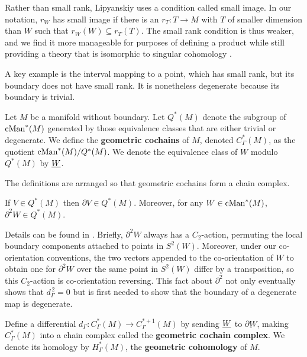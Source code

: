 Rather than small rank, Lipyanskiy uses a condition called small image.
In our notation, $r_W$ has small image if there is an $r_T \colon T \to M$ with $T$ of smaller dimension than $W$ such that $r_W(W) \subseteq r_T(T)$.
The small rank condition is thus weaker, and we find it more manageable for purposes of defining a product while still providing a theory that is isomorphic to singular cohomology \cite{medina2022foundations}.

A key example is the interval mapping to a point, which has small rank, but its boundary does not have small rank.
It is nonetheless degenerate because its boundary is trivial.

\begin{definition}\label{D:geometric cohomology}
	Let $M$ be a manifold without boundary. Let $Q^*(M)$ denote the subgroup
	of $\mathrm{cMan}^*(M)$ generated by those equivalence classes that are either trivial or degenerate.
	We define the \textbf{geometric cochains} of $M$, denoted $C_\Gamma^*(M)$, as the quotient $\mathrm{cMan}^*(M)/ Q^*(M)$.
	We denote the equivalence class of $W$ modulo $Q^*(M)$ by $\underline{W}$.
\end{definition}

The definitions are arranged so that geometric cochains form a chain complex.

\begin{proposition}
	If $V \in Q^*(M)$ then $\partial V \in Q^*(M)$.
	Moreover, for any $W \in \mathrm{cMan}^*(M)$, $\partial^2 W \in Q^*(M)$.
\end{proposition}

Details can be found in \cite{Lipy14, medina2022foundations}.
Briefly, $\partial^2 W$ always has a $C_2$-action, permuting the local boundary components attached to points in $S^2(W)$.
Moreover, under our co-orientation conventions, the two vectors appended to the co-orientation of $W$ to obtain one for $\partial^2 W$ over the same point in $S^2(W)$ differ by a transposition, so this $C_2$-action is co-orientation reversing.
This fact about $\partial^2$ not only eventually shows that $d_\Gamma^{\,2} = 0$ but is first needed to show that the boundary of a degenerate map is degenerate.

\begin{definition}
	Define a differential $d_\Gamma \colon C_\Gamma^*(M) \to C_\Gamma^{*+1}(M)$ by sending $\underline{W}$ to $ \underline{\partial W}$, making $C_\Gamma^*(M)$ into a chain complex called the {\bf geometric cochain complex}.
	We denote its homology by $H^*_\Gamma(M)$, the \textbf{geometric cohomology} of $M$.
\end{definition}

